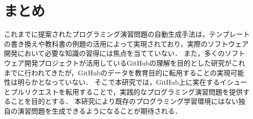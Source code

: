 \section{まとめ}
これまでに提案されたプログラミング演習問題の自動生成手法は，テンプレートの書き換えや教科書の例題の活用によって実現されており，実際のソフトウェア開発において必要な知識の習得には焦点を当てていない．
また，多くのソフトウェア開発プロジェクトが活用しているGitHubの理解を目的とした研究がこれまでに行われてきたが，GitHubのデータを教育目的に転用することの実現可能性は明らかとなっていない．
そこで本研究では，GitHub上に実在するイシューとプルリクエストを転用することで，実践的なプログラミング演習問題を提供することを目的とする．
本研究により既存のプログラミング学習環境にはない独自の演習問題を生成できるようになることが期待される．
